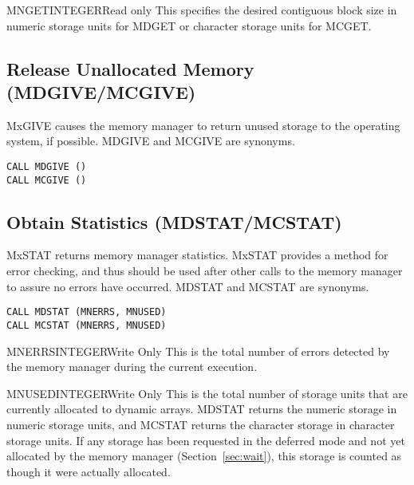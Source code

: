\begin{argy}{MNGET}{INTEGER}{Read only}
This specifies the desired contiguous block size in numeric storage units
for MDGET or character storage units for MCGET.
\end{argy}

\subsection{Release Unallocated Memory (MDGIVE/MCGIVE)}
MxGIVE
causes the memory manager to return unused storage to the operating
system, if possible. MDGIVE and MCGIVE are synonyms.
\begin{verbatim}
CALL MDGIVE ()
CALL MCGIVE ()
\end{verbatim}

\subsection{Obtain Statistics (MDSTAT/MCSTAT)}
MxSTAT returns memory manager statistics.  MxSTAT provides a method
for error checking, and thus should be used after other calls to the memory
manager to assure no errors have occurred. MDSTAT and MCSTAT are synonyms.
\begin{verbatim}
CALL MDSTAT (MNERRS, MNUSED)
CALL MCSTAT (MNERRS, MNUSED)
\end{verbatim}

\begin{argy}{MNERRS}{INTEGER}{Write Only}
This is the total number of errors detected by the memory manager during the
current execution.
\end{argy}

\begin{argy}{MNUSED}{INTEGER}{Write Only}
This is the total number of storage units that are currently allocated to
dynamic arrays. MDSTAT returns the numeric storage in numeric storage units,
and MCSTAT returns the character storage in character storage units. If any
storage has been requested in the deferred mode and not yet allocated by the
memory manager (Section~\ref{sec:wait}), this storage is counted as though
it were actually allocated.
\end{argy}

